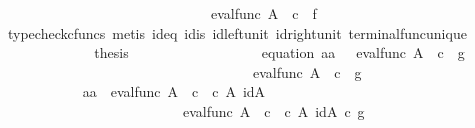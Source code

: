 \begin{isabellebody}
\ \ \ \ \ \ \ \ \ \ \ \ \ \ \ \ \ \ \ \ \ \ \ \ \ \ \ \ \ \ eval{\isacharunderscore}{\kern0pt}func\ A\ {\isasymOmega}\ {\isasymcirc}\isactrlsub c\ {\isasymlangle}{\isasymf}{\isacharcomma}{\kern0pt}\ f{\isasymrangle}{\isasymrangle}{\isachardoublequoteclose}\ \ \ \ \isanewline
\ \ \ \ \ \ \ \ \ \ \ \ \isamarkupfalse%
\ {\isacharparenleft}{\kern0pt}typecheck{\isacharunderscore}{\kern0pt}cfuncs{\isacharcomma}{\kern0pt}\ metis\ id{}{\isacharunderscore}{\kern0pt}eq\ id{}{\isacharunderscore}{\kern0pt}is\ id{\isacharunderscore}{\kern0pt}left{\isacharunderscore}{\kern0pt}unit{}\ id{\isacharunderscore}{\kern0pt}right{\isacharunderscore}{\kern0pt}unit{}\ terminal{\isacharunderscore}{\kern0pt}func{\isacharunderscore}{\kern0pt}unique{\isacharparenright}{\kern0pt}\isanewline
\ \ \ \ \ \ \ \ \ \ \isamarkupfalse%
\ \isamarkupfalse%
\ {\isacharquery}{\kern0pt}thesis\isacommand{{\isachardot}{\kern0pt}}\isamarkupfalse%
\isanewline
\ \ \ \ \ \ \ \ \isamarkupfalse%
\isanewline
\ \ \ \ \ \ \ \ \isamarkupfalse%
\ equation{}{\isacharcolon}{\kern0pt}\ {\isachardoublequoteopen}{\isasymlangle}a{}{\isacharcomma}{\kern0pt}a{}{\isasymrangle}\ {\isacharequal}{\kern0pt}\ \ {\isasymlangle}eval{\isacharunderscore}{\kern0pt}func\ A\ {\isasymOmega}\ {\isasymcirc}\isactrlsub c\ {\isasymlangle}{\isasymt}{\isacharcomma}{\kern0pt}\ g{\isasymrangle}{\isacharcomma}{\kern0pt}\isanewline
\ \ \ \ \ \ \ \ \ \ \ \ \ \ \ \ \ \ \ \ \ \ \ \ \ \ \ \ \ \ \ \ \ \ \ \ eval{\isacharunderscore}{\kern0pt}func\ A\ {\isasymOmega}\ {\isasymcirc}\isactrlsub c\ {\isasymlangle}{\isasymf}{\isacharcomma}{\kern0pt}\ g{\isasymrangle}{\isasymrangle}{\isachardoublequoteclose}\isanewline
\ \ \ \ \ \ \ \ \isamarkupfalse%
\ {\isacharminus}{\kern0pt}\ \isanewline
\ \ \ \ \ \ \ \ \ \ \isamarkupfalse%
\ {\isachardoublequoteopen}{\isasymlangle}a{}{\isacharcomma}{\kern0pt}a{}{\isasymrangle}\ {\isacharequal}{\kern0pt}\ {\isasymlangle}eval{\isacharunderscore}{\kern0pt}func\ A\ {\isasymOmega}\ {\isasymcirc}\isactrlsub c\ {\isasymlangle}{\isasymt}\ {\isasymcirc}\isactrlsub c\ {\isasymbeta}\isactrlbsub A\isactrlbsup {\isasymOmega}\isactrlesup \isactrlesub {\isacharcomma}{\kern0pt}\ id{\isacharparenleft}{\kern0pt}A\isactrlbsup {\isasymOmega}\isactrlesup {\isacharparenright}{\kern0pt}{\isasymrangle}{\isacharcomma}{\kern0pt}\isanewline
\ \ \ \ \ \ \ \ \ \ \ \ \ \ \ \ \ \ \ \ \ \ \ \ \ \ eval{\isacharunderscore}{\kern0pt}func\ A\ {\isasymOmega}\ {\isasymcirc}\isactrlsub c\ {\isasymlangle}{\isasymf}\ {\isasymcirc}\isactrlsub c\ {\isasymbeta}\isactrlbsub A\isactrlbsup {\isasymOmega}\isactrlesup \isactrlesub {\isacharcomma}{\kern0pt}\ id{\isacharparenleft}{\kern0pt}A\isactrlbsup {\isasymOmega}\isactrlesup {\isacharparenright}{\kern0pt}{\isasymrangle}{\isasymrangle}\ {\isasymcirc}\isactrlsub c\ g{\isachardoublequoteclose}\isanewline

\end{isabellebody}
